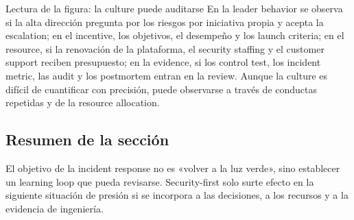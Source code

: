 
\begin{knowledgebox}{Lectura de la figura: la culture puede auditarse}
En la leader behavior se observa si la alta dirección pregunta por los riesgos por iniciativa propia y acepta la escalation; en el incentive, los objetivos, el desempeño y los launch criteria; en el resource, si la renovación de la plataforma, el security staffing y el customer support reciben presupuesto; en la evidence, si los control test, los incident metric, las audit y los postmortem entran en la review. Aunque la culture es difícil de cuantificar con precisión, puede observarse a través de conductas repetidas y de la resource allocation.
\end{knowledgebox}

\subsection{Resumen de la sección}

El objetivo de la incident response no es «volver a la luz verde», sino establecer un learning loop que pueda revisarse. Security-first solo surte efecto en la siguiente situación de presión si se incorpora a las decisiones, a los recursos y a la evidencia de ingeniería.
